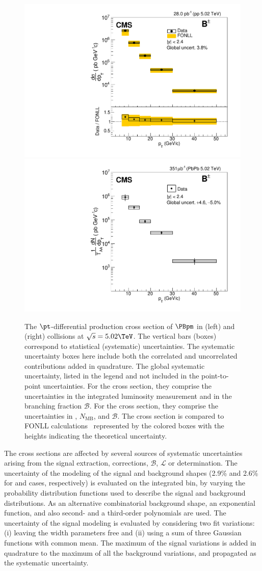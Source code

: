 \begin{figure}[tb]
\centering
\includegraphics[width=.45\textwidth]{Figure_002-a.pdf}
\includegraphics[width=.45\textwidth]{Figure_002-b.pdf}
\caption{
The $\pt$-differential production cross section of $\PBpm$ in \pp (left) and \PbPb (right) collisions at $\sqrts=5.02\TeV$. The vertical bars (boxes) correspond to statistical (systematic) uncertainties.
The systematic uncertainty boxes here include both the correlated and uncorrelated contributions added in quadrature. The global systematic uncertainty, listed in the legend and not included in the point-to-point uncertainties. For the \pp cross section, they comprise the uncertainties in the integrated luminosity measurement and in the branching fraction $\mathcal{B}$. For the \PbPb cross section, they comprise the uncertainties in \TAA, $N_{\text{MB}}$, and $\mathcal{B}$.
The \pp cross section is compared to FONLL calculations~\cite{FONLLcharmbottomPP1,FONLLcharmbottomPP2,FONLLcharmbottomPP3} represented by the colored boxes with the heights indicating the theoretical uncertainty.}
\label{fig:crosssections}
\end{figure}

The cross sections are affected by several sources of systematic uncertainties arising from the signal extraction, corrections, $\mathcal{B}$, $\mathcal{L}$ or \TAA determination.
The uncertainty of the modeling of the signal and background shapes (2.9\% and 2.6\% for \pp and \PbPb cases, respectively) is evaluated on the \pt integrated bin, by varying the probability distribution functions used to describe the signal and background distributions. As an alternative combinatorial background shape, an exponential function, and also second- and a third-order polynomials are used. The uncertainty of the signal modeling is evaluated by considering two fit variations: (i) leaving the width parameters free and (ii) using a sum of three Gaussian functions with common mean. The maximum of the signal variations is added in quadrature to the maximum of all the background variations, and  propagated as the systematic uncertainty.

